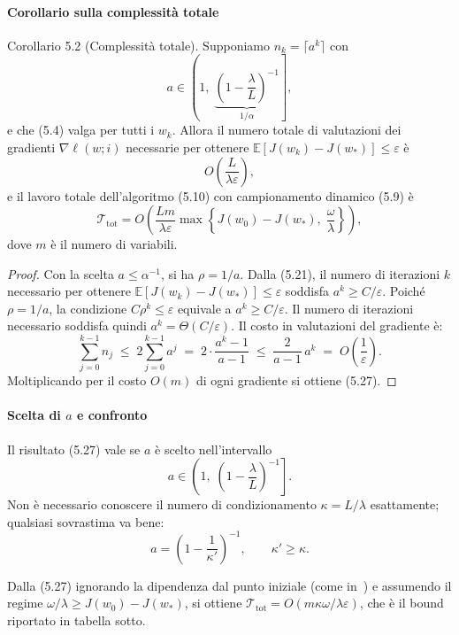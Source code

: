 \documentclass[italian, a4paper, twoside, binding=6mm]{sapthesis}
\begin{document}
\paragraph{Corollario sulla complessità totale}

\begin{corollarybox}
  Corollario 5.2 (Complessità totale).
  Supponiamo \(n_k = \lceil a^k \rceil\) con
  \[
  a \in \left(1,\; \underbrace{\left(1 - \frac{\lambda}{L}\right)^{-1}}_{1/\alpha}\right],
  \]
  e che (5.4) valga per tutti i \(w_k\). Allora il numero totale di valutazioni dei gradienti \(\nabla \ell(w;i)\) necessarie per ottenere \(\mathbb{E}[J(w_k) - J(w_*)] \le \varepsilon\) è
  \[
  O\!\left(\frac{L}{\lambda \varepsilon}\right), \tag{5.26}
  \]
  e il lavoro totale dell'algoritmo (5.10) con campionamento dinamico (5.9) è
  \[
  \mathcal{T}_{\mathrm{tot}} = O\!\left(\frac{L m}{\lambda \varepsilon} \max\left\{J(w_0) - J(w_*),\; \frac{\omega}{\lambda}\right\}\right), \tag{5.27}
  \]
  dove \(m\) è il numero di variabili.
\end{corollarybox}

\begin{proof}
Con la scelta \(a \le \alpha^{-1}\), si ha \(\rho = 1/a\). Dalla (5.21), il numero di iterazioni \(k\) necessario per ottenere \(\mathbb{E}[J(w_k) - J(w_*)] \le \varepsilon\) soddisfa \(a^k \ge C/\varepsilon\). Poiché \(\rho = 1/a\), la condizione \(C\rho^k \le \varepsilon\) equivale a \(a^k \ge C/\varepsilon\). Il numero di iterazioni necessario soddisfa quindi \(a^k = \Theta(C/\varepsilon)\). Il costo in valutazioni del gradiente è:
\[
\sum_{j=0}^{k-1} n_j \;\le\; 2\sum_{j=0}^{k-1} a^j
\;=\; 2\cdot \frac{a^k - 1}{a-1}
\;\le\; \frac{2}{a-1}\, a^k
\;=\; O\!\left(\frac{1}{\varepsilon}\right).\]
Moltiplicando per il costo \(O(m)\) di ogni gradiente si ottiene (5.27).
\end{proof}


\paragraph{Scelta di \(a\) e confronto}

Il risultato (5.27) vale se \(a\) è scelto nell'intervallo
\[
a \in \left(1,\; \left(1 - \frac{\lambda}{L}\right)^{-1}\right].
\]
Non è necessario conoscere il numero di condizionamento \(\kappa = L/\lambda\) esattamente; qualsiasi sovrastima va bene:
\[
a = \left(1 - \frac{1}{\kappa'}\right)^{-1}, \qquad \kappa' \ge \kappa. \tag{5.28}
\]

Dalla (5.27) ignorando la dipendenza dal punto iniziale (come in~\cite{bottou2008}) e assumendo il regime $\omega/\lambda \geq J(w_0)-J(w_*)$, si ottiene $\mathcal{T}_{\mathrm{tot}} = O(m\kappa\omega/\lambda\varepsilon)$, che è il bound riportato in tabella sotto.
\end{document}
